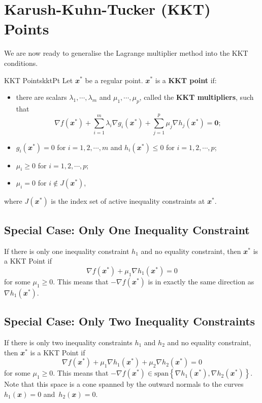 \documentclass[math, code]{amznotes}
\theoremstyle{remark}
\begin{document}
\section{Karush-Kuhn-Tucker (KKT) Points}
We are now ready to generalise the Lagrange multiplier method into the KKT conditions.
\begin{dfnbox}{KKT Points}{kktPt}
    Let $\mathbfit{x}^*$ be a regular point. $\mathbfit{x}^*$ is a {\color{red} \textbf{KKT point}} if:
    \begin{itemize}
        \item there are scalars $\lambda_1, \cdots, \lambda_m$ and $\mu_1, \cdots, \mu_p$, called the {\color{red} \textbf{KKT multipliers}}, such that
        \begin{equation*}
            \nabla f(\mathbfit{x}^*) + \sum_{i = 1}^{m}\lambda_i\nabla g_i(\mathbfit{x}^*) + \sum_{j = 1}^{p}\mu_j\nabla h_j(\mathbfit{x}^*) = \mathbf{0};
        \end{equation*}
        \item $g_i(\mathbfit{x}^*) = 0$ for $i = 1, 2, \cdots, m$ and $h_i(\mathbfit{x}^*) \leq 0$ for $i = 1, 2, \cdots, p$;
        \item $\mu_i \geq 0$ for $i = 1, 2, \cdots, p$;
        \item $\mu_i = 0$ for $i \notin J(\mathbfit{x}^*)$,
    \end{itemize}
    where $J(\mathbfit{x}^*)$ is the index set of active inequality constraints at $\mathbfit{x}^*$.
\end{dfnbox}
\subsection{Special Case: Only One Inequality Constraint}
If there is only one inequality constraint $h_1$ and no equality constraint, then $\mathbfit{x}^*$ is a KKT Point if
\begin{equation*}
    \nabla f(\mathbfit{x}^*) + \mu_1\nabla h_1(\mathbfit{x}^*) = 0
\end{equation*}
for some $\mu_1 \geq 0$. This means that $-\nabla f(\mathbfit{x}^*)$ is in exactly the same direction as $\nabla h_1(\mathbfit{x}^*)$.
\subsection{Special Case: Only Two Inequality Constraints}
If there is only two inequality constraints $h_1$ and $h_2$ and no equality constraint, then $\mathbfit{x}^*$ is a KKT Point if
\begin{equation*}
    \nabla f(\mathbfit{x}^*) + \mu_1\nabla h_1(\mathbfit{x}^*) + \mu_2\nabla h_2(\mathbfit{x}^*) = 0
\end{equation*}
for some $\mu_1 \geq 0$. This means that $-\nabla f(\mathbfit{x}^*) \in \mathrm{span}\left\{\nabla h_1(\mathbfit{x}^*), \nabla h_2(\mathbfit{x}^*)\right\}$. Note that this space is a cone spanned by the outward normals to the curves $h_1(\mathbfit{x}) = 0$ and~$h_2(\mathbfit{x}) = 0$.
\end{document}
